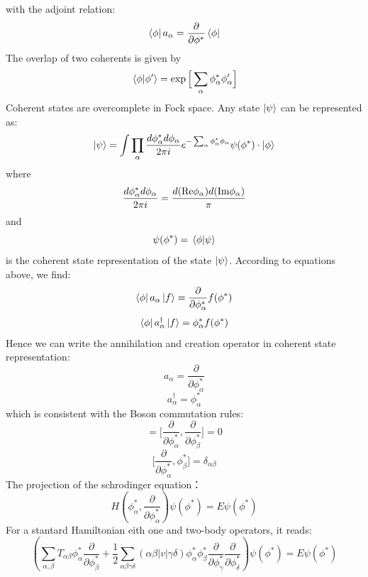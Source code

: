 \documentclass[12pt]{article}
\begin{document}
with the adjoint relation:
\begin{equation*}
    \bra{\phi}a_\alpha=\frac{\partial}{\partial\phi^*}\bra{\phi}
\end{equation*}
The overlap of two coherents is given by 
\begin{equation*}
    \braket*{\phi}{\phi'}=\exp\Big[\sum_\alpha\phi_\alpha^*\phi'_\alpha\Big]
\end{equation*}
Coherent states are overcomplete in Fock space. Any state $\ket{\psi}$ can be 
represented as:
\begin{equation*}
    \ket{\psi}=\int \prod_\alpha\frac{d\phi^*_\alpha d\phi_\alpha}{2\pi i}
    e^{-\sum_\alpha \phi_\alpha^*\phi_\alpha}\psi(\phi^*)\cdot\ket{\phi}
\end{equation*}
where 
\begin{equation*}
    \frac{d\phi^*_\alpha d\phi_\alpha}{2\pi i}=
    \frac{d({\rm Re}\phi_\alpha)d({\rm Im}\phi_\alpha)}{\pi}
\end{equation*}
and
\begin{equation*}
    \psi(\phi^*)=\braket*{\phi}{\psi}
\end{equation*}
is the coherent state representation of the state $\ket{\psi}$.
According to equations above, we find:
\begin{equation*}
    \bra{\phi}a_\alpha\ket{f}=\frac{\partial}{\partial\phi_\alpha^*}f(\phi^*)
\end{equation*}
\begin{equation*}
    \bra{\phi}a^\dagger_\alpha\ket{f}=\phi_\alpha^* f(\phi^*)
\end{equation*}
Hence we can write the annihilation and creation operator in coherent state 
representation:
\begin{equation*}
    a_\alpha=\frac{\partial}{\partial\phi_\alpha^*}
\end{equation*}
\begin{equation*}
    a^\dagger_\alpha=\phi^*_\alpha
\end{equation*}
which is consistent with the Boson commutation rules:
\begin{equation*}
    [\phi^*_\alpha,\phi^*_\beta]=\bigg[\frac{\partial}{\partial\phi^*_\alpha},
    \frac{\partial}{\partial\phi^*_\beta}\bigg]=0
\end{equation*}
\begin{equation*}
    \bigg[\frac{\partial}{\partial\phi^*_\alpha},\phi^*_\beta\bigg]
    =\delta_{\alpha\beta}
\end{equation*}
The projection of the schrodinger equation：
\begin{equation*}
    H(\phi^*_\alpha,\frac{\partial}{\partial\phi^*_\alpha})\psi(\phi^*)
    =E\psi(\phi^*)
\end{equation*}
For a stantard Hamiltonian eith one and two-body operators, it reads:
\begin{equation*}
    \left(\sum_{\alpha,\beta}T_{\alpha\beta}\phi^*_\alpha
    \frac{\partial}{\partial\phi^*_\beta}+\frac{1}{2}
    \sum_{\alpha\beta\gamma\delta}(\alpha\beta|v|\gamma\delta)
    \phi^*_\alpha\phi^*_\beta\frac{\partial}{\partial\phi^*_\gamma}
    \frac{\partial}{\partial\phi^*_\delta}\right)\psi(\phi^*)=E\psi(\phi^*)
\end{equation*}
\end{document}
